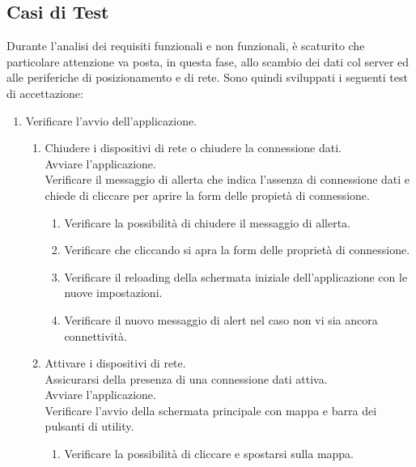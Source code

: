 \subsection{Casi di Test}
Durante l'analisi dei requisiti funzionali e non funzionali, è scaturito che particolare attenzione va posta, in questa fase, allo scambio dei dati col server ed alle periferiche di posizionamento e di rete.
Sono quindi sviluppati i seguenti test di accettazione:
\begin{enumerate}
\item Verificare l'avvio dell'applicazione.
\begin{enumerate}
\item Chiudere i dispositivi di rete o chiudere la connessione dati. \\Avviare l'applicazione. \\Verificare il messaggio di allerta che indica l'assenza di connessione dati e chiede di cliccare per aprire la form delle propietà di connessione.
\begin{enumerate}
\item Verificare la possibilità di chiudere il messaggio di allerta.
\item Verificare che cliccando si apra la form delle proprietà di connessione.
\item Verificare il reloading della schermata iniziale dell'applicazione con le nuove impostazioni.
\item Verificare il nuovo messaggio di alert nel caso non vi sia ancora connettività.
\end{enumerate}

\item Attivare i dispositivi di rete. \\Assicurarsi della presenza di una connessione dati attiva. \\Avviare l'applicazione. \\Verificare l'avvio della schermata principale con mappa e barra dei pulsanti di utility.
\begin{enumerate} 
\item Verificare la possibilità di cliccare e spostarsi sulla mappa.
\end{enumerate}
\end{enumerate}


\end{enumerate}
